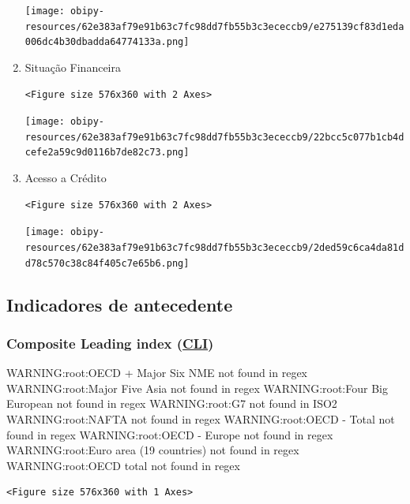 \documentclass[11pt]{article}
\begin{document}
\begin{enumerate}
\begin{center}
\texttt{[image: obipy-resources/62e383af79e91b63c7fc98dd7fb55b3c3ececcb9/e275139cf83d1eda006dc4b30dbadda64774133a.png]}
\end{center}

\item Situação Financeira
\label{sec:org19838eb}

\begin{verbatim}
<Figure size 576x360 with 2 Axes>
\end{verbatim}


\begin{center}
\texttt{[image: obipy-resources/62e383af79e91b63c7fc98dd7fb55b3c3ececcb9/22bcc5c077b1cb4dcefe2a59c9d0116b7de82c73.png]}
\end{center}


\item Acesso a Crédito
\label{sec:org2f30ff7}

\begin{verbatim}
<Figure size 576x360 with 2 Axes>
\end{verbatim}


\begin{center}
\texttt{[image: obipy-resources/62e383af79e91b63c7fc98dd7fb55b3c3ececcb9/2ded59c6ca4da81dd78c570c38c84f405c7e65b6.png]}
\end{center}
\end{enumerate}

\subsection{Indicadores de antecedente}
\label{sec:orgd2959e3}

\subsubsection{Composite Leading index (\href{https://stats.oecd.org/Index.aspx?DataSetCode=MEI\_CLI}{CLI})}
\label{sec:org73e7a77}

WARNING:root:OECD + Major Six NME not found in regex
WARNING:root:Major Five Asia not found in regex
WARNING:root:Four Big European not found in regex
WARNING:root:G7 not found in ISO2
WARNING:root:NAFTA not found in regex
WARNING:root:OECD - Total not found in regex
WARNING:root:OECD - Europe not found in regex
WARNING:root:Euro area (19 countries) not found in regex
WARNING:root:OECD total  not found in regex

\begin{verbatim}
<Figure size 576x360 with 1 Axes>
\end{verbatim}
\end{document}
